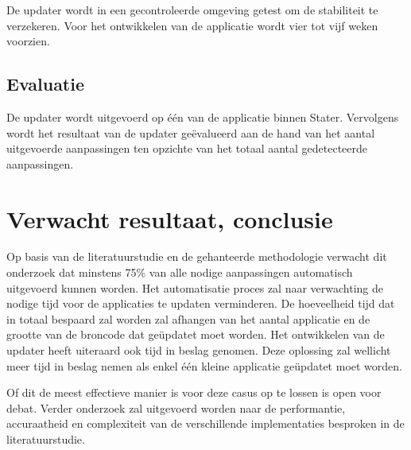 De updater wordt in een gecontroleerde omgeving getest om de stabiliteit te verzekeren.
Voor het ontwikkelen van de applicatie wordt vier tot vijf weken voorzien.

\subsection{Evaluatie}

De updater wordt uitgevoerd op één van de applicatie binnen Stater.
Vervolgens wordt het resultaat van de updater geëvalueerd aan de hand van het aantal uitgevoerde aanpassingen ten opzichte van het totaal aantal gedetecteerde aanpassingen.

\section{Verwacht resultaat, conclusie}
\label{sec:verwachte_resultaten}

Op basis van de literatuurstudie en de gehanteerde methodologie verwacht dit onderzoek dat minstens 75\% van alle nodige aanpassingen automatisch uitgevoerd kunnen worden.
Het automatisatie proces zal naar verwachting de nodige tijd voor de applicaties te updaten verminderen.
De hoeveelheid tijd dat in totaal bespaard zal worden zal afhangen van het aantal applicatie en de grootte van de broncode dat geüpdatet moet worden.
Het ontwikkelen van de updater heeft uiteraard ook tijd in beslag genomen.
Deze oplossing zal wellicht meer tijd in beslag nemen als enkel één kleine applicatie geüpdatet moet worden.

Of dit de meest effectieve manier is voor deze casus op te lossen is open voor debat.
Verder onderzoek zal uitgevoerd worden naar de performantie, accuraatheid en complexiteit van de verschillende implementaties besproken in de literatuurstudie.

